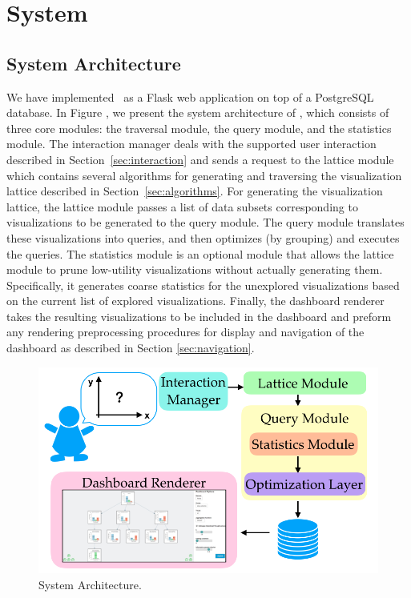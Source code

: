 \section{System}
\subsection{System Architecture}
We have implemented \system\ as a Flask web application on top of a PostgreSQL database. In Figure \label{system_architecture}, we present the system architecture of \system, which consists of three core modules: the traversal module, the query module, and the statistics module. The interaction manager deals with the supported user interaction described in Section~\ref{sec:interaction} and sends a request to the lattice module which  contains several algorithms for generating and traversing the visualization lattice described in Section~\ref{sec:algorithms}. For generating the visualization lattice, the lattice module passes a list of data subsets corresponding to visualizations to be generated to the query module. The query module translates these visualizations into queries, and then optimizes (by grouping) and executes the queries. The statistics module is an optional module that allows the lattice module to prune low-utility visualizations without actually generating them. Specifically, it generates coarse statistics for the unexplored visualizations based on the current list of explored visualizations. Finally, the dashboard renderer takes the resulting visualizations to be included in the dashboard and preform any rendering preprocessing procedures for display and navigation of the dashboard as described in Section \ref{sec:navigation}.
\begin{figure}[ht!]
\centering
\includegraphics[width=\linewidth]{figures/system_architecture.png}
\caption{System Architecture.}%
\label{system_architecture}
\end{figure}



